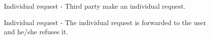 \begin{figure}[ht]
    \caption{Individual request - Third party make an individual request.}
    \label{RV3}
\end{figure}

\begin{figure}[ht]
    \caption{Individual request - The individual request is forwarded to the user and he/she refuses it.}
    \label{RV4}
\end{figure}

